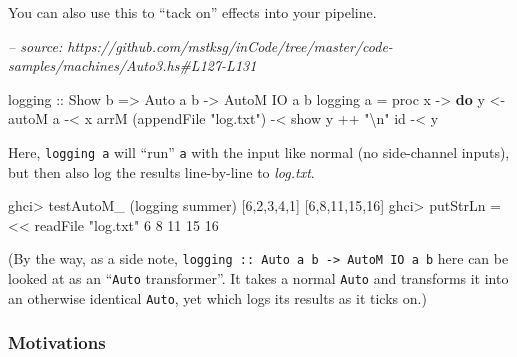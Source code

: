 \documentclass[]{article}
\newenvironment{Shaded}{}{}
\newcommand{\CommentTok}[1]{\textcolor[rgb]{0.38,0.63,0.69}{\textit{#1}}}
\newcommand{\DataTypeTok}[1]{\textcolor[rgb]{0.56,0.13,0.00}{#1}}
\newcommand{\DecValTok}[1]{\textcolor[rgb]{0.25,0.63,0.44}{#1}}
\newcommand{\FunctionTok}[1]{\textcolor[rgb]{0.02,0.16,0.49}{#1}}
\newcommand{\KeywordTok}[1]{\textcolor[rgb]{0.00,0.44,0.13}{\textbf{#1}}}
\newcommand{\NormalTok}[1]{#1}
\newcommand{\OtherTok}[1]{\textcolor[rgb]{0.00,0.44,0.13}{#1}}
\newcommand{\StringTok}[1]{\textcolor[rgb]{0.25,0.44,0.63}{#1}}
\begin{document}
You can also use this to ``tack on'' effects into your pipeline.

\begin{Shaded}
\begin{Highlighting}[]
\CommentTok{-- source: https://github.com/mstksg/inCode/tree/master/code-samples/machines/Auto3.hs#L127-L131}

\OtherTok{logging ::} \DataTypeTok{Show}\NormalTok{ b }\OtherTok{=>} \DataTypeTok{Auto}\NormalTok{ a b }\OtherTok{->} \DataTypeTok{AutoM} \DataTypeTok{IO}\NormalTok{ a b}
\NormalTok{logging a }\FunctionTok{=}\NormalTok{ proc x }\OtherTok{->} \KeywordTok{do}
\NormalTok{    y }\OtherTok{<-}\NormalTok{ autoM a }\FunctionTok{-<}\NormalTok{ x}
\NormalTok{    arrM (appendFile }\StringTok{"log.txt"}\NormalTok{) }\FunctionTok{-<}\NormalTok{ show y }\FunctionTok{++} \StringTok{"\textbackslash{}n"}
\NormalTok{    id }\FunctionTok{-<}\NormalTok{ y}
\end{Highlighting}
\end{Shaded}

Here, \texttt{logging\ a} will ``run'' \texttt{a} with the input like normal (no
side-channel inputs), but then also log the results line-by-line to
\emph{log.txt}.

\begin{Shaded}
\begin{Highlighting}[]
\NormalTok{ghci}\FunctionTok{>}\NormalTok{ testAutoM_ (logging summer) [}\DecValTok{6}\NormalTok{,}\DecValTok{2}\NormalTok{,}\DecValTok{3}\NormalTok{,}\DecValTok{4}\NormalTok{,}\DecValTok{1}\NormalTok{]}
\NormalTok{[}\DecValTok{6}\NormalTok{,}\DecValTok{8}\NormalTok{,}\DecValTok{11}\NormalTok{,}\DecValTok{15}\NormalTok{,}\DecValTok{16}\NormalTok{]}
\NormalTok{ghci}\FunctionTok{>}\NormalTok{ putStrLn }\FunctionTok{=<<}\NormalTok{ readFile }\StringTok{"log.txt"}
\DecValTok{6}
\DecValTok{8}
\DecValTok{11}
\DecValTok{15}
\DecValTok{16}
\end{Highlighting}
\end{Shaded}

(By the way, as a side note,
\texttt{logging\ ::\ Auto\ a\ b\ -\textgreater{}\ AutoM\ IO\ a\ b} here can be
looked at as an ``\texttt{Auto} transformer''. It takes a normal \texttt{Auto}
and transforms it into an otherwise identical \texttt{Auto}, yet which logs its
results as it ticks on.)

\hypertarget{motivations}{%
\subsubsection{Motivations}\label{motivations}}
\end{document}
